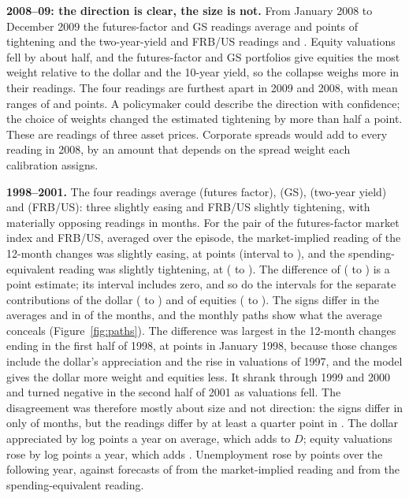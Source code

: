 \documentclass[11pt]{article}
\begin{document}
\textbf{2008--09: the direction is clear, the size is not.} From January 2008 to December 2009 the futures-factor and GS readings average  and  points of tightening and the two-year-yield and FRB/US readings  and . Equity valuations fell by about half, and the futures-factor and GS portfolios give equities the most weight relative to the dollar and the 10-year yield, so the collapse weighs more in their readings. The four readings are furthest apart in 2009 and 2008, with mean ranges of  and  points. A policymaker could describe the direction with confidence; the choice of weights changed the estimated tightening by more than half a point. These are readings of three asset prices. Corporate spreads would add to every reading in 2008, by an amount that depends on the spread weight each calibration assigns.

\textbf{1998--2001.} The four readings average  (futures factor),  (GS),  (two-year yield) and  (FRB/US): three slightly easing and FRB/US slightly tightening, with materially opposing readings in  months. For the pair of the futures-factor market index and FRB/US, averaged over the episode, the market-implied reading of the 12-month changes was slightly easing, at  points (interval  to ), and the spending-equivalent reading was slightly tightening, at  ( to ). The difference of  ( to ) is a point estimate; its interval includes zero, and so do the intervals for the separate contributions of the dollar ( to ) and of equities ( to ). The signs differ in the averages and in  of the  months, and the monthly paths show what the average conceals (Figure~\ref{fig:paths}). The difference was largest in the 12-month changes ending in the first half of 1998, at  points in January 1998, because those changes include the dollar's appreciation and the rise in valuations of 1997, and the model gives the dollar more weight and equities less. It shrank through 1999 and 2000 and turned negative in the second half of 2001 as valuations fell. The disagreement was therefore mostly about size and not direction: the signs differ in only  of  months, but the readings differ by at least a quarter point in . The dollar appreciated by  log points a year on average, which adds  to $D$; equity valuations rose by  log points a year, which adds . Unemployment rose by  points over the following year, against forecasts of  from the market-implied reading and  from the spending-equivalent reading.
\end{document}
